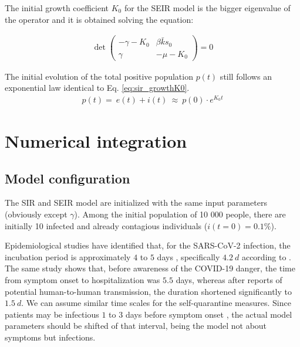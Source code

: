 \documentclass[DIV=12, BCOR=0pt]{scrartcl}  %
\begin{document}
The initial growth coefficient $K_0$ for the SEIR model is the bigger eigenvalue of the operator and it is obtained solving the equation: 

	\begin{align}
		\det 
		\begin{pmatrix}
			- \gamma - K_0 & \beta \bar{k} s_0\\ %
			\gamma & - \mu - K_0  %
		\end{pmatrix} = 0
	\label{eq:seir_K0}
	\end{align}
 
 The initial evolution of the total positive population $p(t)$ still follows an exponential law identical to Eq. \ref{eq:sir_growthK0}.
 \begin{align}
		p(t) = \ e(t) + i(t) \ \approx \  p(0) \cdot e^{K_0 t}
 \end{align}

 
	\section{Numerical integration}
	\label{sec:numerical}
	
  \subsection{Model configuration}
	The SIR and SEIR model are initialized with the same input parameters (obviously except $\gamma$). Among the initial population of 10 000 people, there are initially 10 infected and already contagious individuals ($i(t \! = \! 0) = 0.1 \%$).
	
	Epidemiological studies have identified that, for the SARS-CoV-2 infection, the incubation period is approximately $4$ to $5$ days \citep{Gandhi2020}, specifically $4.2 \ d$ according to \citet{Sanche2020}. The same study shows that, before awareness of the COVID-19 danger, the time from symptom onset to hospitalization was $5.5$ days, whereas after reports of potential human-to-human transmission, the duration shortened significantly to $1.5 \ d$. We can assume similar time scales for the self-quarantine measures. Since patients may be infectious $1$ to $3$ days before symptom onset \citep{Gandhi2020}, the actual model parameters should be shifted of that interval, being the model not about symptoms but infections. 
	
\end{document}
